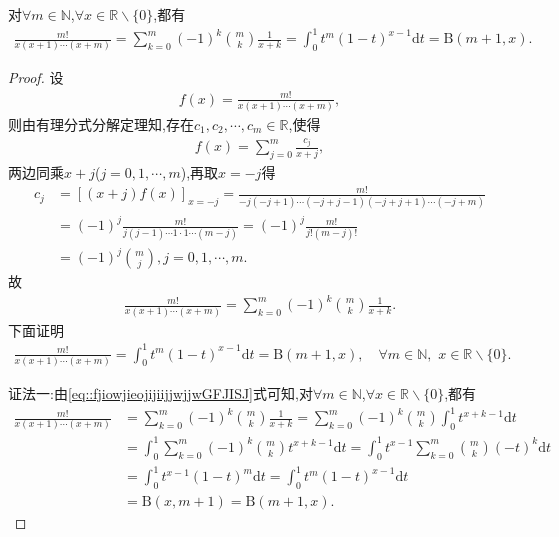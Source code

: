 \documentclass[../../main.tex]{subfiles}%
\begin{document}
\begin{proposition}\label{proposition:组合数相关常用恒等式}
对$\forall m\in \mathbb{N}$,$\forall x\in \mathbb{R} \backslash \{0\}$,都有
\begin{align*}
\frac{m!}{x(x+1)\cdots(x+m)}=\sum_{k=0}^m{(-1) ^k\binom{m}{k}\frac{1}{x+k}}=\int_0^1{t^m\left( 1-t \right) ^{x-1}\mathrm{d}t}=\mathrm{B}\left( m+1,x \right) .
\end{align*}
\end{proposition}
\begin{proof}
设
\begin{align*}
f(x)=\frac{m!}{x(x+1)\cdots(x+m)},
\end{align*}
则由有理分式分解定理知,存在$c_1,c_2,\cdots ,c_m\in \mathbb{R}$,使得
\begin{align*}
f(x)=\sum_{j=0}^m{\frac{c_j}{x+j}},
\end{align*}
两边同乘$x+j$($j=0,1,\cdots ,m$),再取$x=-j$得
\begin{align*}
c_j&=\left[ (x+j) f(x) \right] _{x=-j}=\frac{m!}{-j(-j+1)\cdots(-j+j-1)(-j+j+1)\cdots(-j+m)}
\\
&=(-1) ^j\frac{m!}{j(j-1)\cdots 1\cdot 1\cdots(m-j)}=(-1) ^j\frac{m!}{j!(m-j)!}
\\
&=(-1) ^j\binom{m}{j},j=0,1,\cdots ,m.
\end{align*}
故
\begin{align}\label{eq::fjiowjieojijiijjwjjwGFJISJ}
\frac{m!}{x(x+1)\cdots(x+m)}=\sum_{k=0}^m{(-1) ^k\binom{m}{k}\frac{1}{x+k}}.
\end{align}
下面证明
\begin{align*}
\frac{m!}{x(x+1)\cdots(x+m)}=\int_0^1{t^m\left( 1-t \right) ^{x-1}\mathrm{d}t}=\mathrm{B}\left( m+1,x \right) ,\quad \forall m\in \mathbb{N} ,\,\,x\in \mathbb{R} \backslash \{0\}.
\end{align*}

{\color{blue}证法一:}由\eqref{eq::fjiowjieojijiijjwjjwGFJISJ}式可知,对$\forall m\in \mathbb{N}$,$\forall x\in \mathbb{R} \backslash \{0\}$,都有
\begin{align*}
\frac{m!}{x\left( x+1 \right) \cdots \left( x+m \right)}&=\sum_{k=0}^m{\left( -1 \right) ^k\binom{m}{k}\frac{1}{x+k}}=\sum_{k=0}^m{\left( -1 \right) ^k\binom{m}{k}\int_0^1{t^{x+k-1}\mathrm{d}t}}
\\
&=\int_0^1{\sum_{k=0}^m{\left( -1 \right) ^k\binom{m}{k}t^{x+k-1}\mathrm{d}t}}=\int_0^1{t^{x-1}\sum_{k=0}^m{\binom{m}{k}\left( -t \right) ^k\mathrm{d}t}}
\\
&=\int_0^1{t^{x-1}\left( 1-t \right) ^m\mathrm{d}t}=\int_0^1{t^m\left( 1-t \right) ^{x-1}\mathrm{d}t}
\\
&=\mathrm{B}\left( x,m+1 \right) =\mathrm{B}\left( m+1,x \right) .
\end{align*}


\end{proof}
\end{document}
